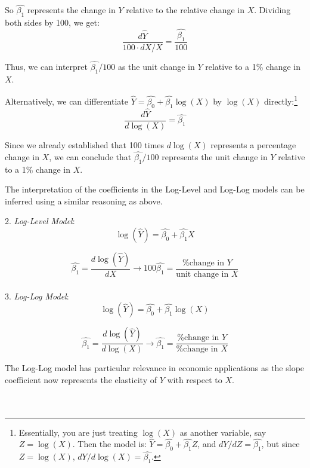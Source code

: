 \documentclass{./../../Latex/handout}
\begin{document}
So $\hat{\beta_1}$ represents the change in $Y$ relative to the relative change in $X$. Dividing both sides by 100, we get:$$ \frac{d \hat{Y} }{100 \cdot dX/X} = \frac{\hat{\beta_1}}{100} $$

Thus, we can interpret $\hat{\beta_1}/100$ as the unit change in $Y$ relative to a 1\% change in $X$.

Alternatively, we can differentiate $\hat{Y} = \hat{\beta_0} + \hat{\beta_1} \log(X)$ by $\log(X)$ directly:\footnote{Essentially, you are just treating $\log(X)$ as another variable, say $Z=\log(X)$. Then the model is: $\hat{Y} = \hat{\beta_0} + \hat{\beta_1} Z$, and $dY/dZ=\hat{\beta_1}$, but since $Z=\log(X)$, $dY/d\log(X)=\hat{\beta_1}$.}
$$ \frac{d \hat{Y} }{d \log(X)} = \hat{\beta_1}$$

Since we already established that 100 times $d \log(X)$ represents a percentage change in $X$, we can conclude that $\hat{\beta_1}/100$ represents the unit change in $Y$ relative to a 1\% change in $X$. 

The interpretation of the coefficients in the Log-Level and Log-Log models can be inferred using a similar reasoning as above.

2. \textit{Log-Level Model}:$$\log(\hat{Y}) = \hat{\beta_0} +  \hat{\beta_1}X$$

$$\hat{\beta_1} = \frac{d \log(\hat{Y}) }{d X} \rightarrow 100 \hat{\beta_1} = \frac{\text{\% change in $Y$}}{\text{unit change in $X$}}  $$ \\

3. \textit{Log-Log Model}:$$\log(\hat{Y}) = \hat{\beta_0} +  \hat{\beta_1} \log(X)$$

$$\hat{\beta_1} = \frac{d \log(\hat{Y}) }{d \log(X)} \rightarrow \hat{\beta_1} = \frac{\text{\% change in $Y$}}{\text{\% change in $X$}}  $$

The Log-Log model has particular relevance in economic applications as the slope coefficient now represents the elasticity of $Y$ with respect to $X$. \\~\\

 \\ 
\end{document}
